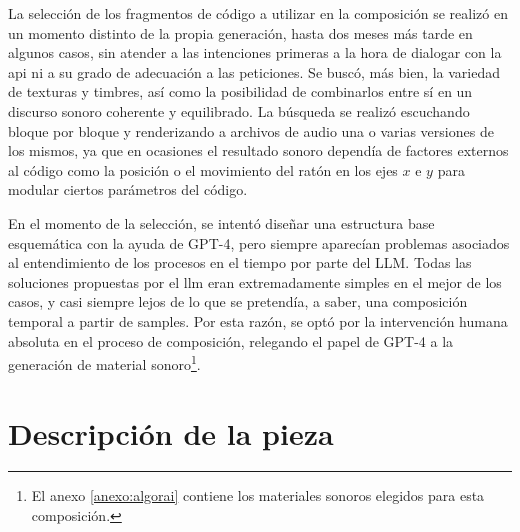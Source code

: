 La selección de los fragmentos de código a utilizar en la composición se realizó en un momento distinto de la propia generación, hasta dos meses más tarde en algunos casos, sin atender a las intenciones primeras a la hora de dialogar con la \gls{api} ni a su grado de adecuación a las peticiones. Se buscó, más bien, la variedad de texturas y timbres, así como la posibilidad de combinarlos entre sí en un discurso sonoro coherente y equilibrado. La búsqueda se realizó escuchando bloque por bloque y renderizando a archivos de audio una o varias versiones de los mismos, ya que en ocasiones el resultado sonoro dependía de factores externos al código como la posición o el movimiento del ratón en los ejes $x$ e $y$ para modular ciertos parámetros del código. 

En el momento de la selección, se intentó diseñar una estructura base esquemática con la ayuda de GPT-4, pero siempre aparecían problemas asociados al entendimiento de los procesos en el tiempo por parte del LLM. Todas las soluciones propuestas por el \gls{llm} eran extremadamente simples en el mejor de los casos, y casi siempre lejos de lo que se pretendía, a saber, una composición temporal a partir de samples. Por esta razón, se optó por la intervención humana absoluta en el proceso de composición, relegando el papel de GPT-4 a la generación de material sonoro\footnote{El anexo \ref{anexo:algorai} contiene los materiales sonoros elegidos para esta composición.}.

\section{Descripción de la pieza}

